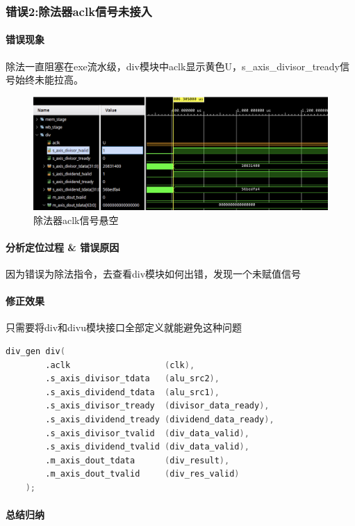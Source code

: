 \documentclass[UTF-8,twoside,c5size]{ctexart}
\begin{document}
	\subsubsection{错误\textbf{2:}除法器aclk信号未接入}
	
	\paragraph{错误现象}\hfill
	
	除法一直阻塞在exe流水级，div模块中aclk显示黄色U，s\_axis\_divisor\_tready信号始终未能拉高。
	
	\begin{figure}[h]
		\centering
		\includegraphics[width=0.7\linewidth]{no_aclk.png}
		\caption[no\_aclk]{除法器aclk信号悬空}
		\label{fig:noaclk}
	\end{figure}
	
	\paragraph{分析定位过程 \& 错误原因}\hfill
	
	因为错误为除法指令，去查看div模块如何出错，发现一个未赋值信号
	
	\paragraph{修正效果}\hfill
	
	只需要将div和divu模块接口全部定义就能避免这种问题
	
	\begin{lstlisting}[language=verilog]
	div_gen div(
		.aclk                   (clk),
		.s_axis_divisor_tdata   (alu_src2),
		.s_axis_dividend_tdata  (alu_src1),
		.s_axis_divisor_tready  (divisor_data_ready),
		.s_axis_dividend_tready (dividend_data_ready),
		.s_axis_divisor_tvalid  (div_data_valid),
		.s_axis_dividend_tvalid (div_data_valid),
		.m_axis_dout_tdata      (div_result),
		.m_axis_dout_tvalid     (div_res_valid)
	);
	\end{lstlisting}

	\paragraph{总结归纳}\hfill
	
\end{document}
